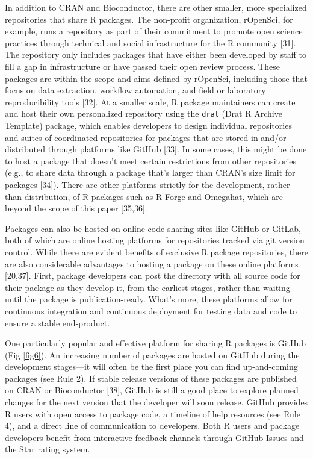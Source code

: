 \documentclass[10pt,letterpaper]{article}
\begin{document}
In addition to CRAN and Bioconductor, there are other smaller, more
specialized repositories that share R packages. The non-profit
organization, rOpenSci, for example, runs a repository as part of their
commitment to promote open science practices through technical and
social infrastructure for the R community {[}31{]}. The repository only
includes packages that have either been developed by staff to fill a gap
in infrastructure or have passed their open review process. These
packages are within the scope and aims defined by rOpenSci, including
those that focus on data extraction, workflow automation, and field or
laboratory reproducibility tools {[}32{]}. At a smaller scale, R package
maintainers can create and host their own personalized repository using
the \texttt{drat} (Drat R Archive Template) package, which enables
developers to design individual repositories and suites of coordinated
repositories for packages that are stored in and/or distributed through
platforms like GitHub {[}33{]}. In some cases, this might be done to
host a package that doesn't meet certain restrictions from other
repositories (e.g., to share data through a package that's larger than
CRAN's size limit for packages {[}34{]}). There are other platforms
strictly for the development, rather than distribution, of R packages
such as R-Forge and Omegahat, which are beyond the scope of this paper
{[}35,36{]}.

Packages can also be hosted on online code sharing sites like GitHub or
GitLab, both of which are online hosting platforms for repositories
tracked via git version control. While there are evident benefits of
exclusive R package repositories, there are also considerable advantages
to hosting a package on these online platforms {[}20,37{]}. First,
package developers can post the directory with all source code for their
package as they develop it, from the earliest stages, rather than
waiting until the package is publication-ready. What's more, these
platforms allow for continuous integration and continuous deployment for
testing data and code to ensure a stable end-product.

One particularly popular and effective platform for sharing R packages
is GitHub (Fig \ref{fig6}). An increasing number of packages are hosted
on GitHub during the development stages---it will often be the first
place you can find up-and-coming packages (see Rule 2). If stable
release versions of these packages are published on CRAN or Bioconductor
{[}38{]}, GitHub is still a good place to explore planned changes for
the next version that the developer will soon release. GitHub provides R
users with open access to package code, a timeline of help resources
(see Rule 4), and a direct line of communication to developers. Both R
users and package developers benefit from interactive feedback channels
through GitHub Issues and the Star rating system.
\end{document}
